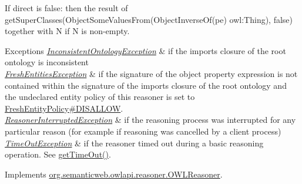 If {\ttfamily direct} is {\ttfamily false}\-: then the result of {\ttfamily get\-Super\-Classes(Object\-Some\-Values\-From(Object\-Inverse\-Of(pe) owl\-:Thing), false)} together with {\ttfamily N} if {\ttfamily N} is non-\/empty.


\begin{DoxyExceptions}{Exceptions}
{\em \hyperlink{classorg_1_1semanticweb_1_1owlapi_1_1reasoner_1_1_inconsistent_ontology_exception}{Inconsistent\-Ontology\-Exception}} & if the imports closure of the root ontology is inconsistent \\
\hline
{\em \hyperlink{classorg_1_1semanticweb_1_1owlapi_1_1reasoner_1_1_fresh_entities_exception}{Fresh\-Entities\-Exception}} & if the signature of the object property expression is not contained within the signature of the imports closure of the root ontology and the undeclared entity policy of this reasoner is set to \hyperlink{enumorg_1_1semanticweb_1_1owlapi_1_1reasoner_1_1_fresh_entity_policy_a762eae6d5b2449d125311ecaabfdc8d0}{Fresh\-Entity\-Policy\#\-D\-I\-S\-A\-L\-L\-O\-W}. \\
\hline
{\em \hyperlink{classorg_1_1semanticweb_1_1owlapi_1_1reasoner_1_1_reasoner_interrupted_exception}{Reasoner\-Interrupted\-Exception}} & if the reasoning process was interrupted for any particular reason (for example if reasoning was cancelled by a client process) \\
\hline
{\em \hyperlink{classorg_1_1semanticweb_1_1owlapi_1_1reasoner_1_1_time_out_exception}{Time\-Out\-Exception}} & if the reasoner timed out during a basic reasoning operation. See \hyperlink{classorg_1_1semanticweb_1_1owlapi_1_1reasoner_1_1impl_1_1_o_w_l_reasoner_base_af55342eaaabb1b72dacfde7a181b93d2}{get\-Time\-Out()}. \\
\hline
\end{DoxyExceptions}


Implements \hyperlink{interfaceorg_1_1semanticweb_1_1owlapi_1_1reasoner_1_1_o_w_l_reasoner_a5fc16703ef858d366ee851f1cc1eb7b9}{org.\-semanticweb.\-owlapi.\-reasoner.\-O\-W\-L\-Reasoner}.

